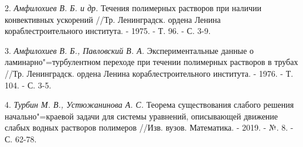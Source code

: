 2. {\it Амфилохиев В. Б. и др.} Течения полимерных растворов при наличии конвективных ускорений //Тр. Ленинградск. ордена Ленина кораблестроительного института. - 1975. - Т. 96. - С. 3-9.

3. {\it Амфилохиев В. Б., Павловский В. А.} Экспериментальные данные о ламинарно"=турбулентном переходе при течении полимерных растворов в трубах //Тр. Ленинградск. ордена Ленина кораблестроительного института. - 1976. - Т. 104. - С. 3-5.

4. {\it Турбин М. В., Устюжанинова А. С.} Теорема существования слабого решения начально"=краевой задачи для системы уравнений, описывающей движение слабых водных растворов полимеров //Изв. вузов. Математика. - 2019. - №. 8. - С. 62-78.
